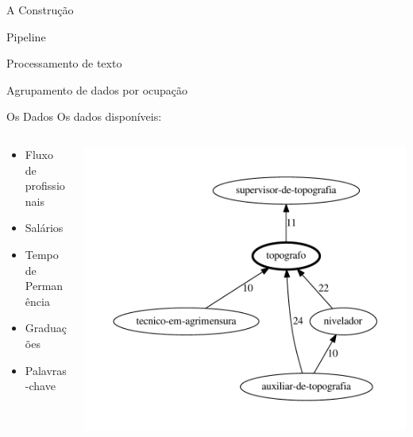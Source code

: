 \documentclass[10pt, hyperref={pdfpagelabels=false}]{beamer}
\begin{document}
\begin{frame}[label=mapa-construcao]{A Construção}
  \begin{center}
    Pipeline
    
    Processamento de texto
    
    Agrupamento de dados por ocupação
  \end{center}
\end{frame}

{
\begin{frame}[label=mapa-dados]{Os Dados}
  Os dados disponíveis:

  \begin{columns}[T,onlytextwidth]
    \begin{column}{0.5\textwidth}
      \begin{itemize}
        \item Fluxo de profissionais
        \item Salários
        \item Tempo de Permanência
        \item Graduações
        \item Palavras-chave
      \end{itemize}
    \end{column}
    
    \begin{column}{0.5\textwidth}
      \includegraphics[width=\textwidth]{cluster_25}
    \end{column}
  \end{columns}
\end{frame}
}
\end{document}
